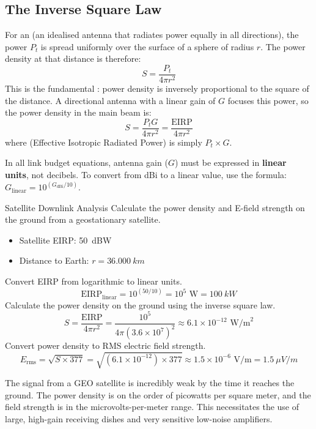 \subsection{The Inverse Square Law}

For an  (an idealised antenna that radiates power equally in all directions), the power $P_t$ is spread uniformly over the surface of a sphere of radius $r$. The power density at that distance is therefore:
\begin{equation}
    S = \frac{P_t}{4\pi r^2}
\end{equation}
This is the fundamental : power density is inversely proportional to the square of the distance. A directional antenna with a linear gain of $G$ focuses this power, so the power density in the main beam is:
\begin{equation}
    S = \frac{P_t G}{4\pi r^2} = \frac{\text{EIRP}}{4\pi r^2}
\end{equation}
where  (Effective Isotropic Radiated Power) is simply $P_t \times G$.

\begin{warningbox}
    In all link budget equations, antenna gain ($G$) must be expressed in \textbf{linear units}, not decibels. To convert from dBi to a linear value, use the formula: $G_{\text{linear}} = 10^{(G_{\text{dBi}}/10)}$.
\end{warningbox}

\begin{workedexample}{Satellite Downlink Analysis}
     Calculate the power density and E-field strength on the ground from a geostationary satellite.
    \begin{itemize}
        \item Satellite EIRP: \qty{50}{dBW}
        \item Distance to Earth: $r = \qty{36,000}{km}$
    \end{itemize}
    \begin{derivationsteps}
        \step Convert EIRP from logarithmic to linear units.
        \[ \text{EIRP}_{\text{linear}} = 10^{(50/10)} = 10^5 \text{ W} = \qty{100}{kW} \]
        \step Calculate the power density on the ground using the inverse square law.
        \[ S = \frac{\text{EIRP}}{4\pi r^2} = \frac{10^5}{4\pi (3.6 \times 10^7)^2} \approx 6.1 \times 10^{-12} \text{ W/m}^2 \]
        \step Convert power density to RMS electric field strength.
        \[ E_{\text{rms}} = \sqrt{S \times 377} = \sqrt{(6.1 \times 10^{-12}) \times 377} \approx 1.5 \times 10^{-6} \text{ V/m} = \qty{1.5}{\mu V/m} \]
    \end{derivationsteps}
     The signal from a GEO satellite is incredibly weak by the time it reaches the ground. The power density is on the order of picowatts per square meter, and the field strength is in the microvolts-per-meter range. This necessitates the use of large, high-gain receiving dishes and very sensitive low-noise amplifiers.
\end{workedexample}

